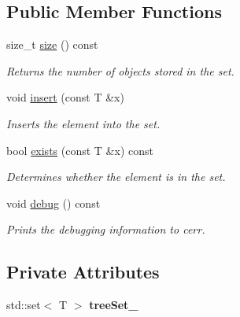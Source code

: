 \subsection*{Public Member Functions}
\begin{DoxyCompactItemize}
\item 
\hypertarget{class_std_tree_set_a842965914d664c4038d2686fbdc674ac}{size\-\_\-t \hyperlink{class_std_tree_set_a842965914d664c4038d2686fbdc674ac}{size} () const }\label{class_std_tree_set_a842965914d664c4038d2686fbdc674ac}

\begin{DoxyCompactList}\small\item\em Returns the number of objects stored in the set. \end{DoxyCompactList}\item 
\hypertarget{class_std_tree_set_aba8ab0c22468935472982b48e6eeef46}{void \hyperlink{class_std_tree_set_aba8ab0c22468935472982b48e6eeef46}{insert} (const T \&x)}\label{class_std_tree_set_aba8ab0c22468935472982b48e6eeef46}

\begin{DoxyCompactList}\small\item\em Inserts the element into the set. \end{DoxyCompactList}\item 
\hypertarget{class_std_tree_set_a6cb54379f9ebbc21162bd50fcb1a40d6}{bool \hyperlink{class_std_tree_set_a6cb54379f9ebbc21162bd50fcb1a40d6}{exists} (const T \&x) const }\label{class_std_tree_set_a6cb54379f9ebbc21162bd50fcb1a40d6}

\begin{DoxyCompactList}\small\item\em Determines whether the element is in the set. \end{DoxyCompactList}\item 
\hypertarget{class_std_tree_set_aece05dc24990b35f85de36087345556c}{void \hyperlink{class_std_tree_set_aece05dc24990b35f85de36087345556c}{debug} () const }\label{class_std_tree_set_aece05dc24990b35f85de36087345556c}

\begin{DoxyCompactList}\small\item\em Prints the debugging information to cerr. \end{DoxyCompactList}\end{DoxyCompactItemize}
\subsection*{Private Attributes}
\begin{DoxyCompactItemize}
\item 
\hypertarget{class_std_tree_set_a34a662ac1c3aa8b20ddcdee491b03992}{std\-::set$<$ T $>$ {\bfseries tree\-Set\-\_\-}}\label{class_std_tree_set_a34a662ac1c3aa8b20ddcdee491b03992}

\end{DoxyCompactItemize}


